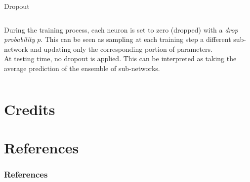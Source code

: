 \documentclass[aspectratio=169]{beamer}
\begin{document}
\begin{frame}{Dropout}
\begin{columns}
\begin{column}{0.7\textwidth}
\vspace{0.5cm}
During the training process, each neuron is set to zero (dropped) with a \emph{drop probability} $p$. This can be seen as sampling at each training step a different sub-network and updating only the corresponding portion of parameters.\\
\vspace{0.5cm}
At testing time, no dropout is applied. This can be interpreted as taking the average prediction of the ensemble of sub-networks.
\end{column}
\end{columns}
\end{frame}



\section{Credits}



\section{References}

\begin{frame}[t]
\frametitle{References}


\end{frame}
\end{document}
